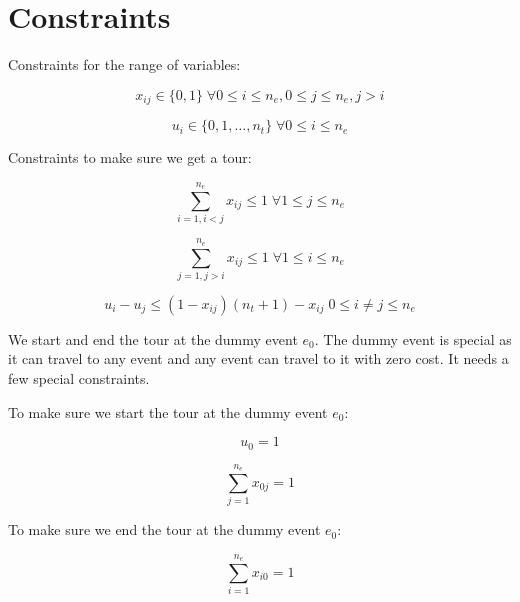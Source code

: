 \documentclass[11pt]{article}
\begin{document}
\section{Constraints}
Constraints for the range of variables:

\begin{equation} \label{constr:x}
    x_{ij} \in \{0, 1\} \; \forall 0 \leq i \leq n_e, 0 \leq j \leq n_e, j > i
\end{equation}

\begin{equation} \label{constr:u}
    u_i \in \{0, 1, \ldots, n_t\} \; \forall 0 \leq i \leq n_e
\end{equation}

Constraints to make sure we get a tour:

\begin{equation} \label{constr:in_edge}
    \sum_{i=1, i < j}^{n_e} x_{ij} \leq 1 \; \forall 1 \leq j \leq n_e
\end{equation}

\begin{equation} \label{constr:out_edge}
    \sum_{j=1, j > i}^{n_e} x_{ij} \leq 1 \; \forall 1 \leq i \leq n_e
\end{equation}

\begin{equation} \label{constr:order}
    u_i - u_j \leq (1 - x_{ij})(n_t + 1) - x_{ij} \; 0 \leq i \neq j \leq n_e
\end{equation}

We start and end the tour at the dummy event $e_0$. The dummy event is special as it can travel to any event and any event can travel to it with zero cost. It needs a few special constraints.

To make sure we start the tour at the dummy event $e_0$:

\begin{equation} \label{constr:start}
    u_0 = 1
\end{equation}

\begin{equation} \label{constr:start_out_edge}
    \sum_{j=1}^{n_e} x_{0j} = 1
\end{equation}

To make sure we end the tour at the dummy event $e_0$:

\begin{equation} \label{constr:end}
    \sum_{i=1}^{n_e} x_{i0} = 1
\end{equation}
\end{document}
